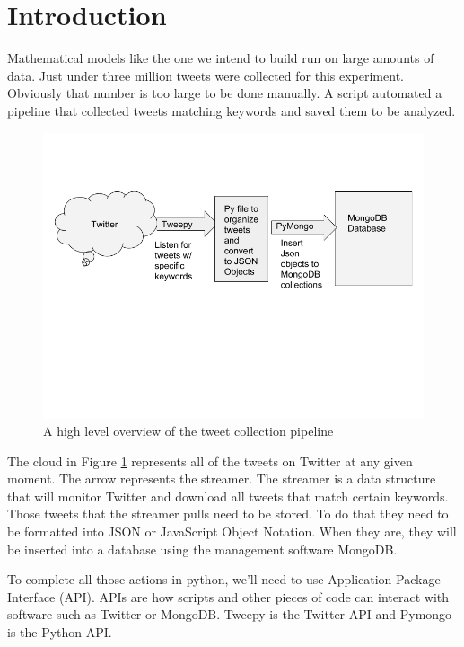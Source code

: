 \documentclass[11pt, twoside, reqno]{article}
\begin{document}
\label{label}
\section{Introduction}
\hspace{0.2in} Mathematical models like the one we intend to build run on large amounts of data. Just under three million tweets were collected for this experiment. Obviously that number is too large to be done manually. A script automated a pipeline that collected tweets matching keywords and saved them to be analyzed. 

\begin{figure}[H]
	\centering
	\includegraphics[scale=0.5]{data_collection}
	\caption{A high level overview of the tweet collection pipeline}
	\label{fig:datacollection}
\end{figure}

The cloud in Figure \ref{fig:datacollection} represents all of the tweets on Twitter at any given moment. The arrow represents the streamer. The streamer is a data structure that will monitor Twitter and download all tweets that match certain keywords. Those tweets that the streamer pulls need to be stored. To do that they need to be formatted into JSON or JavaScript Object Notation. When they are, they will be inserted into a database using the management software MongoDB. 

To complete all those actions in python, we'll need to use Application Package Interface (API). APIs are how scripts and other pieces of code can interact with software such as Twitter or MongoDB. Tweepy is the Twitter API and Pymongo is the Python API. 
 
\end{document}
